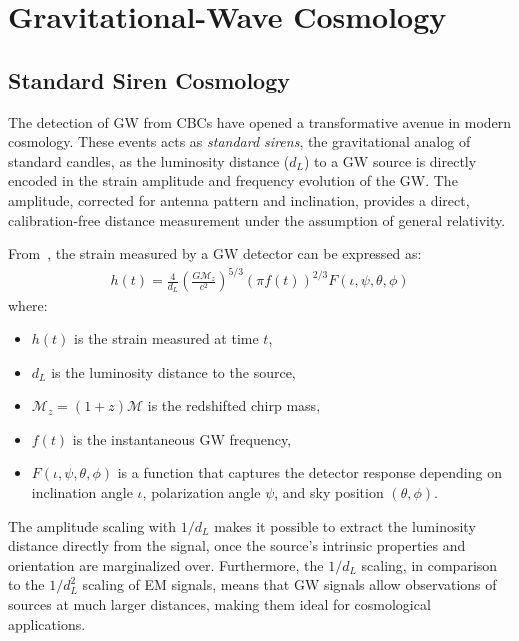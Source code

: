 \chapter{Gravitational-Wave Cosmology}
\label{chap:dark-siren-cosmology}

\section{Standard Siren Cosmology}

The detection of \ac{GW} from \acp{CBC} have opened a transformative avenue in modern cosmology. These events acts as \textit{standard sirens}, the gravitational analog of standard candles, as the luminosity distance ($d_L$) to a \ac{GW} source is directly encoded in the strain amplitude and frequency evolution of the \ac{GW}. The amplitude, corrected for antenna pattern and inclination, provides a direct, calibration-free distance measurement under the assumption of general relativity.

From~\citet{maggiore2007gravitational}, the strain measured by a GW detector can be expressed as:
\begin{align}
h(t) = \frac{4}{d_L} \left( \frac{G\mathcal{M}_z}{c^2} \right)^{5/3}
       \left( \pi f(t) \right)^{2/3} F(\iota, \psi, \theta, \phi)
\label{eq:gw_strain}
\end{align}
where:
\vspace{-1em}
\begin{itemize}
    \item $h(t)$ is the strain measured at time $t$,
    \vspace{-1em}
    \item $d_L$ is the luminosity distance to the source,
    \vspace{-1em}
    \item $\mathcal{M}_z = (1+z)\mathcal{M}$ is the redshifted chirp mass,
    \vspace{-1em}
    \item $f(t)$ is the instantaneous GW frequency,
    \vspace{-1em}
    \item $F(\iota, \psi, \theta, \phi)$ is a function that captures the detector response depending on inclination angle $\iota$, polarization angle $\psi$, and sky position $(\theta, \phi)$.
\end{itemize}

The amplitude scaling with $1/d_L$ makes it possible to extract the luminosity distance directly from the signal, once the source's intrinsic properties and orientation are marginalized over. Furthermore, the $1/d_L$ scaling, in comparison to the $1/d_L^2$ scaling of \ac{EM} signals, means that \ac{GW} signals allow observations of sources at much larger distances, making them ideal for cosmological applications.

